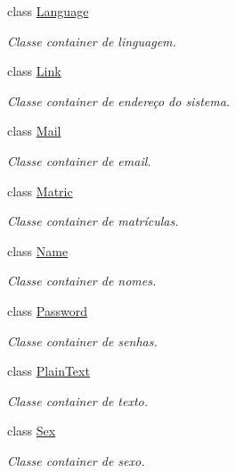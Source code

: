\begin{DoxyCompactItemize}
class \hyperlink{classELO_1_1BaseUnit_1_1Language}{Language}
\begin{DoxyCompactList}\small\item\em Classe container de linguagem. \end{DoxyCompactList}\item 
class \hyperlink{classELO_1_1BaseUnit_1_1Link}{Link}
\begin{DoxyCompactList}\small\item\em Classe container de endereço do sistema. \end{DoxyCompactList}\item 
class \hyperlink{classELO_1_1BaseUnit_1_1Mail}{Mail}
\begin{DoxyCompactList}\small\item\em Classe container de email. \end{DoxyCompactList}\item 
class \hyperlink{classELO_1_1BaseUnit_1_1Matric}{Matric}
\begin{DoxyCompactList}\small\item\em Classe container de matrículas. \end{DoxyCompactList}\item 
class \hyperlink{classELO_1_1BaseUnit_1_1Name}{Name}
\begin{DoxyCompactList}\small\item\em Classe container de nomes. \end{DoxyCompactList}\item 
class \hyperlink{classELO_1_1BaseUnit_1_1Password}{Password}
\begin{DoxyCompactList}\small\item\em Classe container de senhas. \end{DoxyCompactList}\item 
class \hyperlink{classELO_1_1BaseUnit_1_1PlainText}{Plain\+Text}
\begin{DoxyCompactList}\small\item\em Classe container de texto. \end{DoxyCompactList}\item 
class \hyperlink{classELO_1_1BaseUnit_1_1Sex}{Sex}
\begin{DoxyCompactList}\small\item\em Classe container de sexo. \end{DoxyCompactList}\end{DoxyCompactItemize}
